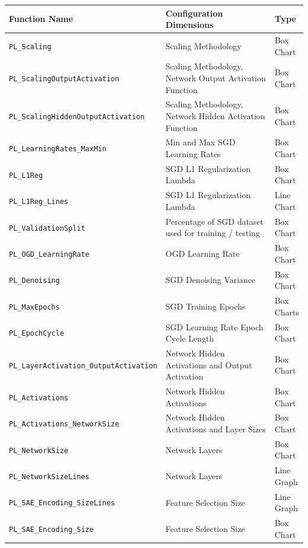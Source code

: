 \documentclass[a4paper,11pt,oneside]{article}
\theoremstyle{plain}
\theoremstyle{definition}
\begin{document}
	\begin{longtable}{|p{0.5\linewidth}|p{0.4\linewidth}|p{0.1\linewidth}|}
		\hline
		\rowcolor{beaublue}
		\textbf{Function Name} &\textbf{Configuration Dimensions}&\textbf{Type}  \\\hline	
		\texttt{PL\_Scaling} & {Scaling Methodology}& {Box Chart} \\\hline
		\texttt{PL\_ScalingOutputActivation} & {Scaling Methodology, Network Output Activation Function}& {Box Chart} \\\hline
		\texttt{PL\_ScalingHiddenOutputActivation} & {Scaling Methodology, Network Hidden Activation Function}& {Box Chart} \\\hline
		\texttt{PL\_LearningRates\_MaxMin}& {Min and Max SGD Learning Rates} & {Box Chart} \\\hline
		\texttt{PL\_L1Reg} & {SGD L1 Regularization Lambda}& {Box Chart} \\\hline
		\texttt{PL\_L1Reg\_Lines} & {SGD L1 Regularization Lambda}& {Line Chart} \\\hline		
		\texttt{PL\_ValidationSplit} & {Percentage of SGD dataset used for training / testing}& {Box Chart} \\\hline
		\texttt{PL\_OGD\_LearningRate}& {OGD Learning Rate} & {Box Chart} \\\hline
		\texttt{PL\_Denoising} & {SGD Denoising Variance}& {Box Chart} \\\hline
		\texttt{PL\_MaxEpochs} & {SGD Training Epochs}& {Box Charts} \\\hline
		\texttt{PL\_EpochCycle}& {SGD Learning Rate Epoch Cycle Length} & {Box Chart} \\\hline
		\texttt{PL\_LayerActivation\_OutputActivation} & {Network Hidden Activations and Output Activation}& {Box Chart} \\\hline
		\texttt{PL\_Activations} & {Network Hidden Activations}& {Box Chart} \\\hline
		\texttt{PL\_Activations\_NetworkSize}& {Network Hidden Activations and Layer Sizes} & {Box Chart} \\\hline
		\texttt{PL\_NetworkSize}& {Network Layers} & {Box Chart} \\\hline
		\texttt{PL\_NetworkSizeLines}& {Network Layers} & {Line Graph} \\\hline
		\texttt{PL\_SAE\_Encoding\_SizeLines}& {Feature Selection Size} & {Line Graph} \\\hline
		\texttt{PL\_SAE\_Encoding\_Size} & {Feature Selection Size}& {Box Chart} \\\hline

\end{longtable}
\end{document}
